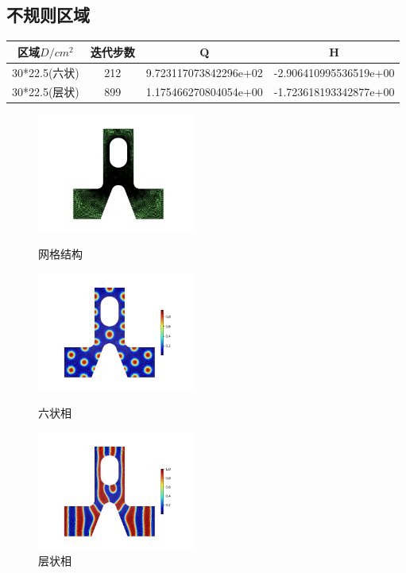 \documentclass[12pt]{article}
\begin{document}
\begin{CJK}{UTF8}{gkai}
  \subsection{不规则区域}   
  \begin{table}[H]
  		\centering
  	\begin{tabular}{cccc}
  		\toprule
  		区域$D/cm^2$ &	迭代步数 & Q &  H \\
  		\midrule
  		30*22.5(六状)&212& 9.723117073842296e+02 & -2.906410995536519e+00\\
  		30*22.5(层状)&899 &1.175466270804054e+00 & -1.723618193342877e+00\\
  		\bottomrule
  	\end{tabular}
  \end{table}
  
  \begin{figure}[H]
  	\setlength{\abovecaptionskip}{0.cm}
  	\setlength{\belowcaptionskip}{-0.cm}
  	\begin{minipage}[!htbp]{0.3\linewidth}
  		\includegraphics[width=5.2cm]{Figure_bc.png}
  		\caption*{网格结构}
  	\end{minipage}
  	\hspace{0.23in}
  	\begin{minipage}[!htbp]{0.3\linewidth}
  		\includegraphics[width=5.2cm]{scftfigurebuming.png}
  		\caption*{六状相}
  	\end{minipage}
  	\hspace{0.23in}
  	\begin{minipage}[!htbp]{0.3\linewidth}
  		\includegraphics[width=5.2cm]{scftfigure880.png}
  		\caption*{层状相}
  	\end{minipage}
  \end{figure}

\end{CJK}
\end{document}
